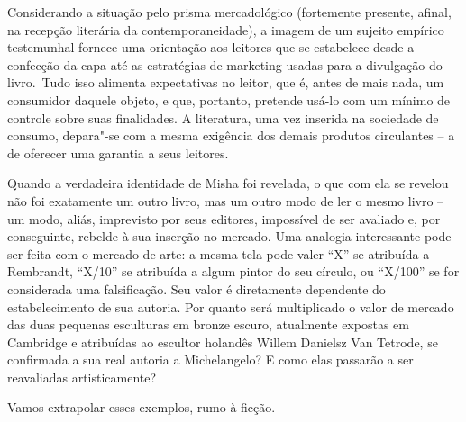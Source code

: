 Considerando a situação pelo prisma mercadológico (fortemente presente,
afinal, na recepção literária da contemporaneidade), a imagem de um
sujeito empírico testemunhal fornece uma orientação aos leitores que se
estabelece desde a confecção da capa até as estratégias de marketing
usadas para a divulgação do livro.~Tudo isso alimenta expectativas no
leitor, que é, antes de mais nada, um consumidor daquele objeto, e que,
portanto, pretende usá-lo com um mínimo de controle sobre suas
finalidades. A literatura, uma vez inserida na sociedade de consumo,
depara"-se com a mesma exigência dos demais produtos circulantes -- a de
oferecer uma garantia a seus leitores.

Quando a verdadeira identidade de Misha foi revelada, o que com ela se
revelou não foi exatamente um outro livro, mas um outro modo de ler o
mesmo livro -- um modo, aliás, imprevisto por seus editores, impossível
de ser avaliado e, por conseguinte, rebelde à sua inserção no mercado.
Uma analogia interessante pode ser feita com o mercado de arte: a mesma
tela pode valer ``X'' se atribuída a Rembrandt, ``X/10'' se atribuída a
algum pintor do seu círculo, ou ``X/100'' se for considerada uma
falsificação. Seu valor é diretamente dependente do estabelecimento de
sua autoria. Por quanto será multiplicado o valor de mercado das duas
pequenas esculturas em bronze escuro, atualmente expostas em Cambridge e
atribuídas ao escultor holandês Willem Danielsz Van Tetrode, se
confirmada a sua real autoria a Michelangelo? E como elas passarão a ser
reavaliadas artisticamente?

Vamos extrapolar esses exemplos, rumo à ficção.

